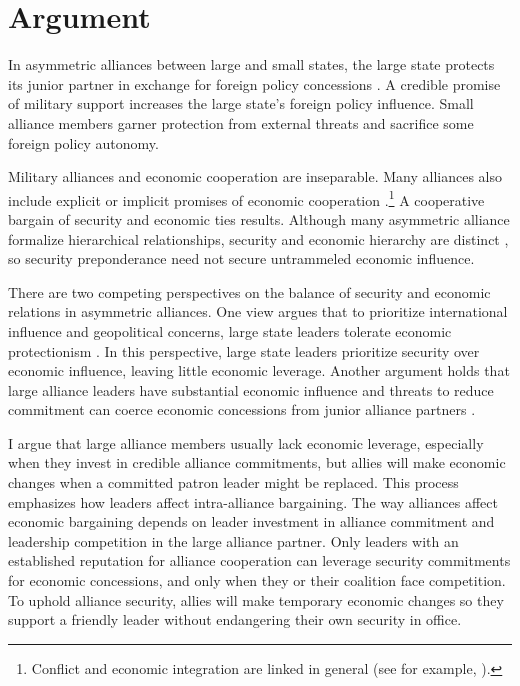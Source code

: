 \documentclass[12pt]{article}
\begin{document}
\section{Argument}


In asymmetric alliances between large and small states, the large state protects its junior partner in exchange for foreign policy concessions \citep{Morrow1991}.
A credible promise of military support increases the large state's foreign policy influence. 
Small alliance members garner protection from external threats and sacrifice some foreign policy autonomy. 


Military alliances and economic cooperation are inseparable.
Many alliances also include explicit or implicit promises of economic cooperation \citep{GowaMansfield2004, LongLeeds2006, Davis2008, Poast2012}.\footnote{Conflict and economic integration are linked in general (see for example, \citep{GartzkeLi2003, Chen2021}).}
A cooperative bargain of security and economic ties results. 
Although many asymmetric alliance formalize hierarchical relationships, security and economic hierarchy are distinct \citep{Lake2009}, so security preponderance need not secure untrammeled economic influence. 


There are two competing perspectives on the balance of security and economic relations in asymmetric alliances.
One view argues that to prioritize international influence and geopolitical concerns, large state leaders tolerate economic protectionism \citep{Drezner2013, WolfordKim2017}. 
In this perspective, large state leaders prioritize security over economic influence, leaving little economic leverage. 
Another argument holds that large alliance leaders have substantial economic influence \citep{Norrlof2010, Brooksetal2013} and threats to reduce commitment can coerce economic concessions from junior alliance partners \citep{Oatley2015}.  


I argue that large alliance members usually lack economic leverage, especially when they invest in credible alliance commitments, but allies will make economic changes when a committed patron leader might be replaced. 
This process emphasizes how leaders affect intra-alliance bargaining. 
The way alliances affect economic bargaining depends on leader investment in alliance commitment and leadership competition in the large alliance partner.  
Only leaders with an established reputation for alliance cooperation can leverage security commitments for economic concessions, and only when they or their coalition face competition. 
To uphold alliance security, allies will make temporary economic changes so they support a friendly leader without endangering their own security in office. 
\end{document}
